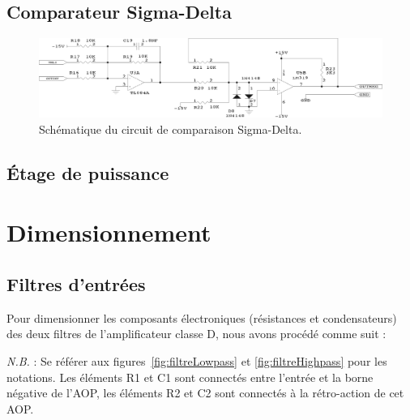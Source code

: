 \documentclass[10pt, oneside, a4paper]{article}
\begin{document}
\subsection{Comparateur Sigma-Delta}
\begin{figure}[!ht]
	\centering
	\includegraphics[width=\textwidth]{image/sch-ctrl.png}
	\caption{Schématique du circuit de comparaison Sigma-Delta.}
\end{figure}

\subsection{Étage de puissance}


\section{Dimensionnement}
\subsection{Filtres d'entrées}
\label{sec:filtrePreAmpli}
Pour dimensionner les composants électroniques (résistances et condensateurs) des deux filtres de l'amplificateur classe D, nous avons procédé comme suit :

\textit{N.B.} : Se référer aux figures~\ref{fig:filtreLowpass} et \ref{fig:filtreHighpass} pour les notations.
Les éléments R1 et C1 sont connectés entre l'entrée et la borne négative de l'AOP, les éléments R2 et C2 sont connectés à la rétro-action de cet AOP.
\end{document}

